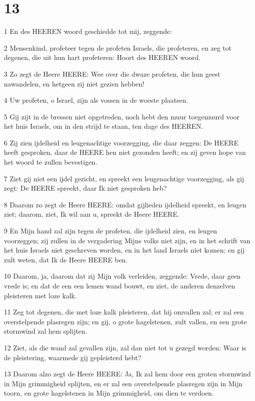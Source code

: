 \chapter{13}

\par 1 En des HEEREN woord geschiedde tot mij, zeggende:
\par 2 Mensenkind, profeteer tegen de profeten Israels, die profeteren, en zeg tot degenen, die uit hun hart profeteren: Hoort des HEEREN woord.
\par 3 Zo zegt de Heere HEERE: Wee over die dwaze profeten, die hun geest nawandelen, en hetgeen zij niet gezien hebben!
\par 4 Uw profeten, o Israel, zijn als vossen in de woeste plaatsen.
\par 5 Gij zijt in de bressen niet opgetreden, noch hebt den muur toegemuurd voor het huis Israels, om in den strijd te staan, ten dage des HEEREN.
\par 6 Zij zien ijdelheid en leugenachtige voorzegging, die daar zeggen: De HEERE heeft gesproken, daar de HEERE hen niet gezonden heeft; en zij geven hope van het woord te zullen bevestigen.
\par 7 Ziet gij niet een ijdel gezicht, en spreekt een leugenachtige voorzegging, als gij zegt: De HEERE spreekt, daar Ik niet gesproken heb?
\par 8 Daarom zo zegt de Heere HEERE: omdat gijlieden ijdelheid spreekt, en leugen ziet; daarom, ziet, Ik wil aan u, spreekt de Heere HEERE.
\par 9 En Mijn hand zal zijn tegen de profeten, die ijdelheid zien, en leugen voorzeggen; zij zullen in de vergadering Mijns volks niet zijn, en in het schrift van het huis Israels niet geschreven worden, en in het land Israels niet komen; en gij zult weten, dat Ik de Heere HEERE ben.
\par 10 Daarom, ja, daarom dat zij Mijn volk verleiden, zeggende: Vrede, daar geen vrede is; en dat de een een lemen wand bouwt, en ziet, de anderen denzelven pleisteren met loze kalk.
\par 11 Zeg tot degenen, die met loze kalk pleisteren, dat hij omvallen zal; er zal een overstelpende plasregen zijn; en gij, o grote hagelstenen, zult vallen, en een grote stormwind zal hem splijten.
\par 12 Ziet, als die wand zal gevallen zijn, zal dan niet tot u gezegd worden: Waar is de pleistering, waarmede gij gepleisterd hebt?
\par 13 Daarom alzo zegt de Heere HEERE: Ja, Ik zal hem door een groten stormwind in Mijn grimmigheid splijten, en er zal een overstelpende plasregen zijn in Mijn toorn, en grote hagelstenen in Mijn grimmigheid, om dien te verdoen.
